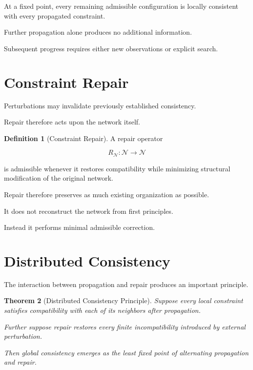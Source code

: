 \documentclass[11pt,oneside]{book}
\numberwithin{equation}{chapter}
\theoremstyle{definition}
\newtheorem{definition}{Definition}[chapter]
\theoremstyle{plain}
\newtheorem{theorem}[definition]{Theorem}
\begin{document}
At a fixed point, every remaining admissible configuration is locally
consistent with every propagated constraint.

Further propagation alone produces no additional information.

Subsequent progress requires either new observations or explicit search.

\section{Constraint Repair}

Perturbations may invalidate previously established consistency.

Repair therefore acts upon the network itself.

\begin{definition}[Constraint Repair]

A repair operator

\[
R_{\mathcal{N}}
:
\mathcal{N}
\rightarrow
\mathcal{N}
\]

is admissible whenever it restores compatibility while minimizing structural
modification of the original network.

\end{definition}

Repair therefore preserves as much existing organization as possible.

It does not reconstruct the network from first principles.

Instead it performs minimal admissible correction.

\section{Distributed Consistency}

The interaction between propagation and repair produces an important
principle.

\begin{theorem}[Distributed Consistency Principle]

Suppose every local constraint satisfies compatibility with each of its
neighbors after propagation.

Further suppose repair restores every finite incompatibility introduced by
external perturbation.

Then global consistency emerges as the least fixed point of alternating
propagation and repair.

\end{theorem}
\end{document}
